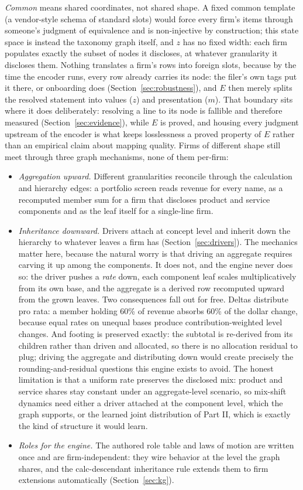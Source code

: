 \documentclass[11pt]{article}
\begin{document}
\emph{Common} means shared coordinates, not shared shape. A fixed common template (a vendor-style schema of standard slots) would force every firm's items through someone's judgment of equivalence and is non-injective by construction; this state space is instead the taxonomy graph itself, and $z$ has no fixed width: each firm populates exactly the subset of nodes it discloses, at whatever granularity it discloses them. Nothing translates a firm's rows into foreign slots, because by the time the encoder runs, every row already carries its node: the filer's own tags put it there, or onboarding does (Section~\ref{sec:robustness}), and $E$ then merely splits the resolved statement into values ($z$) and presentation ($m$). That boundary sits where it does deliberately: resolving a line to its node is fallible and therefore measured (Section~\ref{sec:evidence}), while $E$ is proved, and housing every judgment upstream of the encoder is what keeps losslessness a proved property of $E$ rather than an empirical claim about mapping quality. Firms of different shape still meet through three graph mechanisms, none of them per-firm:
\begin{itemize}
  \item \emph{Aggregation upward.} Different granularities reconcile through the calculation and hierarchy edges: a portfolio screen reads revenue for every name, as a recomputed member sum for a firm that discloses product and service components and as the leaf itself for a single-line firm.
  \item \emph{Inheritance downward.} Drivers attach at concept level and inherit down the hierarchy to whatever leaves a firm has (Section~\ref{sec:drivers}). The mechanics matter here, because the natural worry is that driving an aggregate requires carving it up among the components. It does not, and the engine never does so: the driver pushes a \emph{rate} down, each component leaf scales multiplicatively from its own base, and the aggregate is a derived row recomputed upward from the grown leaves. Two consequences fall out for free. Deltas distribute pro rata: a member holding 60\% of revenue absorbs 60\% of the dollar change, because equal rates on unequal bases produce contribution-weighted level changes. And footing is preserved exactly: the subtotal is re-derived from its children rather than driven and allocated, so there is no allocation residual to plug; driving the aggregate and distributing down would create precisely the rounding-and-residual questions this engine exists to avoid. The honest limitation is that a uniform rate preserves the disclosed mix: product and service shares stay constant under an aggregate-level scenario, so mix-shift dynamics need either a driver attached at the component level, which the graph supports, or the learned joint distribution of Part II, which is exactly the kind of structure it would learn.
  \item \emph{Roles for the engine.} The authored role table and laws of motion are written once and are firm-independent: they wire behavior at the level the graph shares, and the calc-descendant inheritance rule extends them to firm extensions automatically (Section~\ref{sec:kg}).
\end{itemize}
\end{document}
